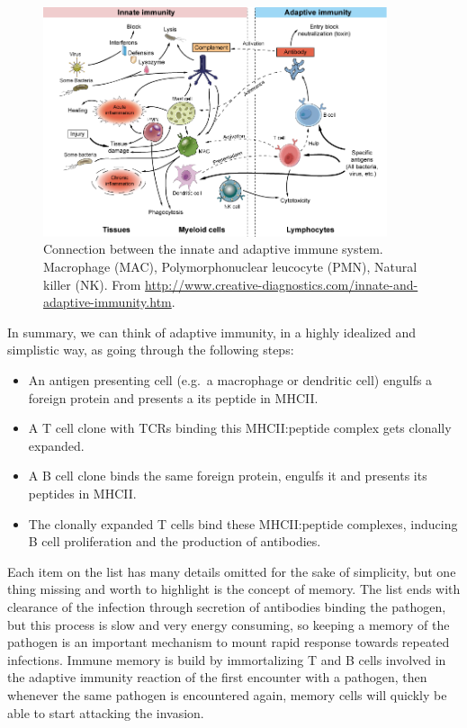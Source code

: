 \begin{figure}
    \centering
    \includegraphics[width=0.9\textwidth]{figures/innate_and_adaptive.png}
    \caption{
        \label{fig:innate_and_adaptive}
        Connection between the innate and adaptive immune system.
        Macrophage (MAC), Polymorphonuclear leucocyte (PMN), Natural killer (NK).
        From \url{http://www.creative-diagnostics.com/innate-and-adaptive-immunity.htm}.
    }
\end{figure}


In summary, we can think of adaptive immunity, in a highly idealized and simplistic way, as going through the following steps:
\begin{itemize}
  \item An antigen presenting cell (e.g.\ a macrophage or dendritic cell) engulfs a foreign protein and presents a its peptide in MHCII.
  \item A T cell clone with TCRs binding this MHCII:peptide complex gets clonally expanded.
  \item A B cell clone binds the same foreign protein, engulfs it and presents its peptides in MHCII.
  \item The clonally expanded T cells bind these MHCII:peptide complexes, inducing B cell proliferation and the production of antibodies.
\end{itemize}
Each item on the list has many details omitted for the sake of simplicity, but one thing missing and worth to highlight is the concept of memory.
The list ends with clearance of the infection through secretion of antibodies binding the pathogen, but this process is slow and very energy consuming, so keeping a memory of the pathogen is an important mechanism to mount rapid response towards repeated infections.
Immune memory is build by immortalizing T and B cells involved in the adaptive immunity reaction of the first encounter with a pathogen, then whenever the same pathogen is encountered again, memory cells will quickly be able to start attacking the invasion.







